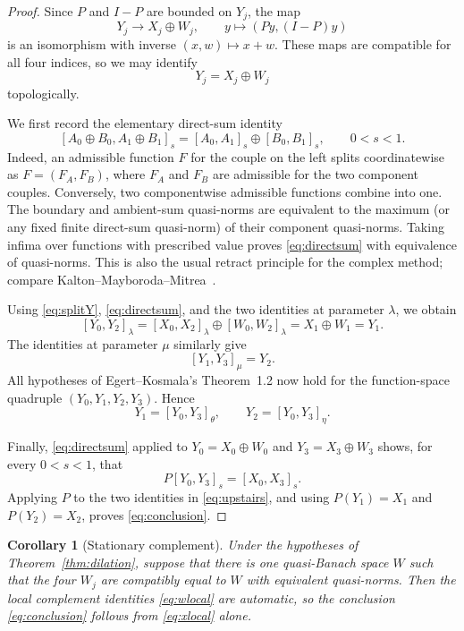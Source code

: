 \documentclass[11pt]{article}
\newtheorem{corollary}[theorem]{Corollary}
\begin{document}
\begin{proof}
Since $P$ and $I-P$ are bounded on $Y_j$, the map
\[
 Y_j\longrightarrow X_j\oplus W_j,\qquad y\longmapsto (Py,(I-P)y)
\]
is an isomorphism with inverse $(x,w)\mapsto x+w$.  These maps are compatible
for all four indices, so we may identify
\begin{equation}\label{eq:splitY}
 Y_j=X_j\oplus W_j
\end{equation}
topologically.

We first record the elementary direct-sum identity
\begin{equation}\label{eq:directsum}
 [A_0\oplus B_0,A_1\oplus B_1]_s
   =[A_0,A_1]_s\oplus[B_0,B_1]_s,\qquad 0<s<1.
\end{equation}
Indeed, an admissible function $F$ for the couple on the left splits
coordinatewise as $F=(F_A,F_B)$, where $F_A$ and $F_B$ are admissible for the
two component couples.  Conversely, two componentwise admissible functions
combine into one.  The boundary and ambient-sum quasi-norms are equivalent to
the maximum (or any fixed finite direct-sum quasi-norm) of their component
quasi-norms.  Taking infima over functions with prescribed value proves
\eqref{eq:directsum} with equivalence of quasi-norms.  This is also the usual
retract principle for the complex method; compare
Kalton--Mayboroda--Mitrea~\cite[Lemma~7.11]{KMM2007}.

Using \eqref{eq:splitY}, \eqref{eq:directsum}, and the two identities at
parameter $\lambda$, we obtain
\[
 [Y_0,Y_2]_\lambda
  =[X_0,X_2]_\lambda\oplus[W_0,W_2]_\lambda
  =X_1\oplus W_1=Y_1.
\]
The identities at parameter $\mu$ similarly give
\[
 [Y_1,Y_3]_\mu=Y_2.
\]
All hypotheses of Egert--Kosmala's Theorem~1.2 now hold for the function-space
quadruple $(Y_0,Y_1,Y_2,Y_3)$.  Hence
\begin{equation}\label{eq:upstairs}
 Y_1=[Y_0,Y_3]_\theta,\qquad Y_2=[Y_0,Y_3]_\eta.
\end{equation}

Finally, \eqref{eq:directsum} applied to $Y_0=X_0\oplus W_0$ and
$Y_3=X_3\oplus W_3$ shows, for every $0<s<1$, that
\[
 P[Y_0,Y_3]_s=[X_0,X_3]_s.
\]
Applying $P$ to the two identities in \eqref{eq:upstairs}, and using
$P(Y_1)=X_1$ and $P(Y_2)=X_2$, proves \eqref{eq:conclusion}.
\end{proof}

\begin{corollary}[Stationary complement]
Under the hypotheses of Theorem~\ref{thm:dilation}, suppose that there is one
quasi-Banach space $W$ such that the four $W_j$ are compatibly equal to $W$
with equivalent quasi-norms.  Then the local complement identities
\eqref{eq:wlocal} are automatic, so the conclusion
\eqref{eq:conclusion} follows from \eqref{eq:xlocal} alone.
\end{corollary}
\end{document}

